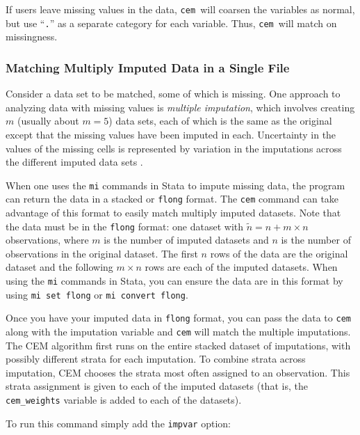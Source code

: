 \documentclass[11pt,titlepage]{article}
\newcommand{\cem}{\texttt{cem }}
\begin{document}
If users leave missing values in the data, \cem will coarsen the variables
as normal, but use ``\texttt{.}'' as a separate category for each
variable. Thus, \cem will match on missingness. 

\subsubsection{Matching Multiply Imputed Data in a Single File}\label{s:mvmiflong}

Consider a data set to be matched, some of which is missing. One
approach to analyzing data with missing values is \emph{multiple
imputation}, which involves creating $m$ (usually about $m=5$) data
sets, each of which is the same as the original except that the
missing values have been imputed in each.  Uncertainty in the values
of the missing cells is represented by variation in the imputations
across the different imputed data sets \citep{KinHonJos01}.

When one uses the \texttt{mi} commands in Stata to impute missing
data, the program can return the data in a stacked or \texttt{flong}
format. The \texttt{cem} command can take advantage of this format to
easily match multiply imputed datasets. Note that the data must be in
the \texttt{flong} format: one dataset with $\tilde{n} = n + m \times
n$ observations, where $m$ is the number of imputed datasets and $n$
is the number of observations in the original dataset. The first $n$
rows of the data are the original dataset and the following $m \times
n$ rows are each of the imputed datasets. When using the \texttt{mi}
commands in Stata, you can ensure the data are in this format by using
\texttt{mi set flong} or \texttt{mi convert flong}.

Once you have your imputed data in \texttt{flong} format, you can pass
the data to \texttt{cem} along with the imputation variable and
\texttt{cem} will match the multiple imputations. The CEM algorithm
first runs on the entire stacked dataset of imputations, with possibly
different strata for each imputation. To combine strata across
imputation, CEM chooses the strata most often assigned to an
observation. This strata assignment is given to each of the imputed
datasets (that is, the \texttt{cem\_weights} variable is added to each
of the datasets).

To run this command simply add the \texttt{impvar} option:
\end{document}
